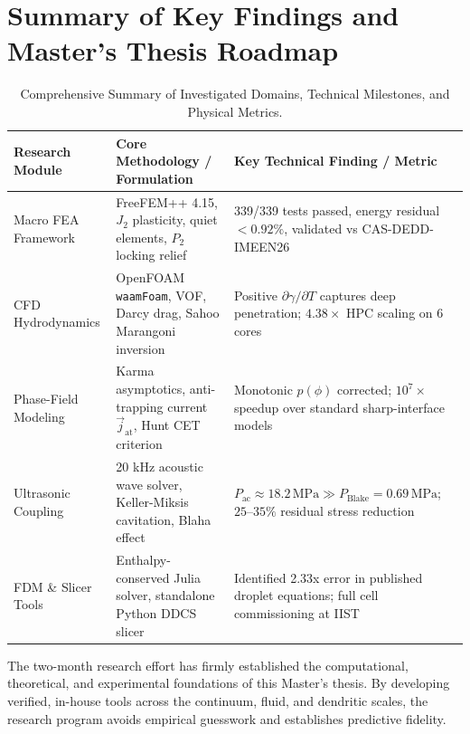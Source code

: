 \documentclass[10pt,a4paper]{article}
\begin{document}
\section{Summary of Key Findings and Master's Thesis Roadmap}

\begin{table}[h!]
\centering
\small
\caption{Comprehensive Summary of Investigated Domains, Technical Milestones, and Physical Metrics.}
\vspace{0.4em}
\begin{tabularx}{\textwidth}{l p{4.6cm} X}
\toprule
\textbf{Research Module} & \textbf{Core Methodology / Formulation} & \textbf{Key Technical Finding / Metric} \\
\midrule
Macro FEA Framework & FreeFEM++ 4.15, \(J_2\) plasticity, quiet elements, \(P_2\) locking relief & 339/339 tests passed, energy residual \(<0.92\%\), validated vs CAS-DEDD-IMEEN26 \\
\addlinespace[0.3em]
CFD Hydrodynamics & OpenFOAM \texttt{waamFoam}, VOF, Darcy drag, Sahoo Marangoni inversion & Positive \(\partial\gamma/\partial T\) captures deep penetration; \(4.38\times\) HPC scaling on 6 cores \\
\addlinespace[0.3em]
Phase-Field Modeling & Karma asymptotics, anti-trapping current \(\vec{j}_{\mathrm{at}}\), Hunt CET criterion & Monotonic \(p(\phi)\) corrected; \(10^7\times\) speedup over standard sharp-interface models \\
\addlinespace[0.3em]
Ultrasonic Coupling & 20 kHz acoustic wave solver, Keller-Miksis cavitation, Blaha effect & \(P_{\mathrm{ac}} \approx 18.2\,\mathrm{MPa} \gg P_{\mathrm{Blake}} = 0.69\,\mathrm{MPa}\); \(25\text{--}35\%\) residual stress reduction \\
\addlinespace[0.3em]
FDM \& Slicer Tools & Enthalpy-conserved Julia solver, standalone Python DDCS slicer & Identified 2.33x error in published droplet equations; full cell commissioning at IIST \\
\bottomrule
\end{tabularx}
\end{table}

The two-month research effort has firmly established the computational, theoretical, and experimental foundations of this Master's thesis. By developing verified, in-house tools across the continuum, fluid, and dendritic scales, the research program avoids empirical guesswork and establishes predictive fidelity. 
\end{document}
